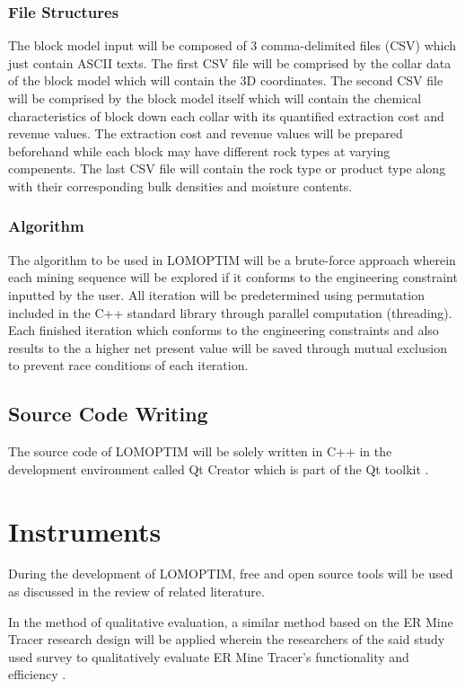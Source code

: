 \documentclass[12pt]{report}
\begin{document}
\subsubsection{File Structures}

The block model input will be composed of 3 comma-delimited files (CSV) which just contain ASCII texts.
The first CSV file will be comprised by the collar data of the block model which will contain the 3D coordinates.
The second CSV file will be comprised by the block model itself which will contain the chemical characteristics of block down each collar with its quantified extraction cost and revenue values.
The extraction cost and revenue values will be prepared beforehand while each block may have different rock types at varying compenents.
The last CSV file will contain the rock type or product type along with their corresponding bulk densities and moisture contents.

\subsubsection{Algorithm}

The algorithm to be used in LOMOPTIM will be a brute-force approach wherein each mining sequence will be explored if it conforms to the engineering constraint inputted by the user.
All iteration will be predetermined using permutation included in the C++ standard library through parallel computation (threading).
Each finished iteration which conforms to the engineering constraints and also results to the a higher net present value will be saved through mutual exclusion to prevent race conditions of each iteration.


\subsection{Source Code Writing}

The source code of LOMOPTIM will be solely written in C++ \cite{cpp} in the development environment called Qt Creator which is part of the Qt toolkit \cite{qt}.

\section{Instruments}

During the development of LOMOPTIM, free and open source tools will be used as discussed in the review of related literature.

In the method of qualitative evaluation, a similar method based on the ER Mine Tracer research design will be applied wherein the researchers of the said study used survey to qualitatively evaluate ER Mine Tracer's functionality and efficiency \cite{ERMineTracer}.
\end{document}

